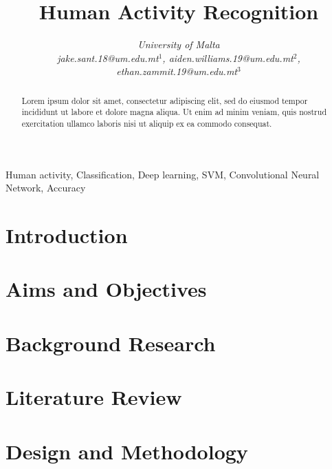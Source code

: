 \documentclass[conference]{IEEEtran}
\begin{document}
\title{Human Activity Recognition}

\author{
\textit{University of Malta}\\
\textit{jake.sant.18@um.edu.mt$^{1}$, aiden.williams.19@um.edu.mt$^{2}$, ethan.zammit.19@um.edu.mt$^{3}$}}

  \maketitle

  \begin{abstract}
    Lorem ipsum dolor sit amet, consectetur adipiscing elit, sed do eiusmod tempor incididunt ut labore et dolore magna aliqua.
    Ut enim ad minim veniam, quis nostrud exercitation ullamco laboris nisi ut aliquip ex ea commodo consequat.
  \end{abstract}

  \begin{IEEEkeywords}
    Human activity, Classification, Deep learning, SVM, Convolutional Neural Network, Accuracy

  \end{IEEEkeywords}

  \section{Introduction}
    

  \section{Aims and Objectives}
       

  \section{Background Research}
    

  \section{Literature Review}
    

  \section{Design and Methodology}
    \label{Design}
    
\end{document}
